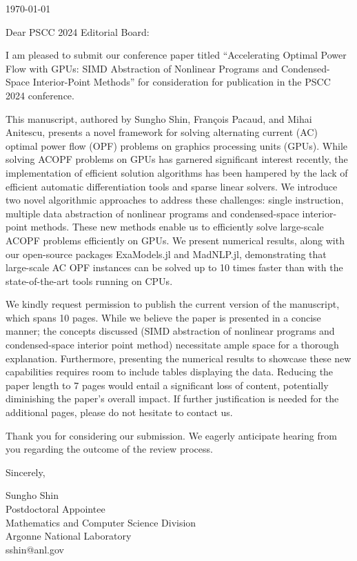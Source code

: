 \documentclass[onecolumn,oneside,11pt]{article}
\begin{document}
\begin{flushleft}
  \today
\end{flushleft}

Dear PSCC 2024 Editorial Board:

I am pleased to submit our conference paper titled ``Accelerating Optimal Power Flow with GPUs: SIMD Abstraction of Nonlinear Programs and Condensed-Space Interior-Point Methods'' for consideration for publication in the PSCC 2024 conference.

This manuscript, authored by Sungho Shin, François Pacaud, and Mihai Anitescu, presents a novel framework for solving alternating current (AC) optimal power flow (OPF) problems on graphics processing units (GPUs). While solving ACOPF problems on GPUs has garnered significant interest recently, the implementation of efficient solution algorithms has been hampered by the lack of efficient automatic differentiation tools and sparse linear solvers. We introduce two novel algorithmic approaches to address these challenges: single instruction, multiple data  abstraction of nonlinear programs and condensed-space interior-point methods. These new methods enable us to efficiently solve large-scale ACOPF problems efficiently on GPUs. We present numerical results, along with our open-source packages ExaModels.jl and MadNLP.jl, demonstrating that large-scale AC OPF instances can be solved up to 10 times faster than with the state-of-the-art tools running on CPUs.

We kindly request permission to publish the current version of the manuscript, which spans 10 pages. While we believe the paper is presented in a concise manner; the concepts discussed (SIMD abstraction of nonlinear programs and condensed-space interior point method) necessitate ample space for a thorough explanation. Furthermore, presenting the numerical results to showcase these new capabilities requires room to include tables displaying the data. Reducing the paper length to 7 pages  would entail a significant loss of content, potentially diminishing the paper's overall impact. If further justification is needed for the additional pages, please do not hesitate to contact us.

Thank you for considering our submission. We eagerly anticipate hearing from you regarding the outcome of the review process.

Sincerely, 

\vspace{1cm}
Sungho Shin\\
Postdoctoral Appointee\\
Mathematics and Computer Science Division\\
Argonne National Laboratory\\
sshin@anl.gov
\end{document}
